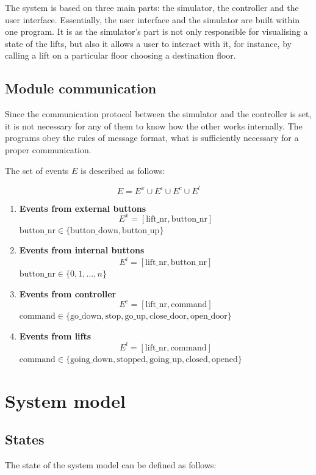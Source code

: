 \documentclass[12pt]{article}
\begin{document}
The system is based on three main parts: the simulator, the controller and the user interface. Essentially, the user interface and the simulator are built within one program. It is as the simulator's part is not only responsible for visualising a state of the lifts, but also it allows a user to interact with it, for instance, by calling a lift on a particular floor choosing a destination floor. 

\subsection{Module communication}

Since the communication protocol between the simulator and the controller is set, it is not necessary for any of them to know how the other works internally. The programs obey the rules of message format, what is sufficiently necessary for a proper communication.
\newline
\newline

The set of events $E$ is described as follows:

\[ E = E^x \cup E^i \cup E^c \cup E^l \]

\begin{enumerate}
\item \textbf{Events from external buttons} 
\[ E^x = [\text{lift\_nr},\text{button\_nr}] \]
\(\text{button\_nr} \in \{\text{button\_down},\text{button\_up}\}\)

\item \textbf{Events from internal buttons}
\[ E^i = [\text{lift\_nr},\text{button\_nr}] \]
\(\text{button\_nr} \in \{0, 1,..., n\}\)

\item \textbf{Events from controller}
\[ E^c = [\text{lift\_nr}, \text{command}] \]
\(\text{command} \in \{\text{go\_down},\text{stop},\text{go\_up},\text{close\_door},\text{open\_door}\}\)

\item \textbf{Events from lifts}
\[ E^l = [\text{lift\_nr}, \text{command}] \]
\(\text{command} \in \{\text{going\_down},\text{stopped},\text{going\_up},\text{closed},\text{opened}\}\)
\end{enumerate}

\section{System model}
\subsection{States}
The state of the system model can be defined as follows:
\end{document}
